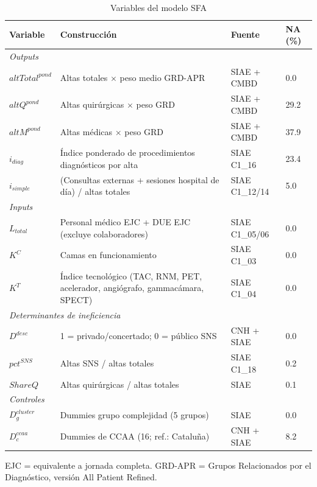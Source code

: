 \documentclass[12pt, a4paper, twoside, openright]{book}
\theoremstyle{plain}
\theoremstyle{definition}
\theoremstyle{remark}
\begin{document}
\begin{table}[htbp]
\centering
\caption{Variables del modelo SFA}
\label{tab:variables}
\begin{threeparttable}
\small
\begin{tabular}{p{2.5cm}p{5cm}p{2.5cm}p{1.5cm}}
\toprule
\textbf{Variable} & \textbf{Construcción} &
\textbf{Fuente} & \textbf{NA (\%)} \\
\midrule
\multicolumn{4}{l}{\textit{Outputs}} \\
$altTotal^{pond}$ & Altas totales $\times$ peso medio GRD-APR & SIAE + CMBD & 0.0 \\
$altQ^{pond}$ & Altas quirúrgicas $\times$ peso GRD & SIAE + CMBD & 29.2 \\
$altM^{pond}$ & Altas médicas $\times$ peso GRD & SIAE + CMBD & 37.9 \\
$i_{diag}$ & Índice ponderado de procedimientos diagnósticos por alta & SIAE C1\_16 & 23.4 \\
$i_{simple}$ & (Consultas externas + sesiones hospital de día) / altas totales & SIAE C1\_12/14 & 5.0 \\[4pt]
\multicolumn{4}{l}{\textit{Inputs}} \\
$L_{total}$ & Personal médico EJC + DUE EJC (excluye colaboradores) & SIAE C1\_05/06 & 0.0 \\
$K^C$ & Camas en funcionamiento & SIAE C1\_03 & 0.0 \\
$K^T$ & Índice tecnológico (TAC, RNM, PET, acelerador, angiógrafo, gammacámara, SPECT) & SIAE C1\_04 & 0.0 \\[4pt]
\multicolumn{4}{l}{\textit{Determinantes de ineficiencia}} \\
$D^{desc}$ & 1 = privado/concertado; 0 = público SNS & CNH + SIAE & 0.0 \\
$pct^{SNS}$ & Altas SNS / altas totales & SIAE C1\_18 & 0.2 \\
$ShareQ$ & Altas quirúrgicas / altas totales & SIAE & 0.1 \\[4pt]
\multicolumn{4}{l}{\textit{Controles}} \\
$D^{cluster}_g$ & Dummies grupo complejidad (5 grupos) & SIAE & 0.0 \\
$D^{ccaa}_c$ & Dummies de CCAA (16; ref.: Cataluña) & CNH + SIAE & 8.2 \\
\bottomrule
\end{tabular}
\begin{tablenotes}
  \small
  \item EJC = equivalente a jornada completa. GRD-APR = Grupos Relacionados por el Diagnóstico, versión All Patient Refined.
\end{tablenotes}
\end{threeparttable}
\end{table}
\end{document}
